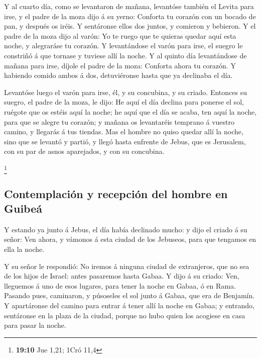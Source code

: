  Y al cuarto día, como se levantaron de mañana, levantóse
también el Levita para irse, y el padre de la moza dijo á su yerno:
Conforta tu corazón con un bocado de pan, y después os iréis.
 Y sentáronse ellos dos juntos, y comieron y bebieron. Y el
padre de la moza dijo al varón: Yo te ruego que te quieras quedar aquí
esta noche, y alegraráse tu corazón.  Y levantándose el
varón para irse, el suegro le constriñó á que tornase y tuviese allí la
noche.  Y al quinto día levantándose de mañana para irse,
díjole el padre de la moza: Conforta ahora tu corazón. Y habiendo comido
ambos á dos, detuviéronse hasta que ya declinaba el día.

 Levantóse luego el varón para irse, él, y su concubina, y
su criado. Entonces su suegro, el padre de la moza, le dijo: He aquí el
día declina para ponerse el sol, ruégote que os estéis aquí la noche; he
aquí que el día se acaba, ten aquí la noche, para que se alegre tu
corazón; y mañana os levantaréis temprano á vuestro camino, y llegarás á
tus tiendas.  Mas el hombre no quiso quedar allí la noche,
sino que se levantó y partió, y llegó hasta enfrente de Jebus, que es
Jerusalem, con su par de asnos aparejados, y con su concubina.

\footnote{\textbf{19:10} Jue 1,21; 1Cró 11,4}

\hypertarget{contemplaciuxf3n-y-recepciuxf3n-del-hombre-en-guibeuxe1}{%
\subsection{Contemplación y recepción del hombre en
Guibeá}\label{contemplaciuxf3n-y-recepciuxf3n-del-hombre-en-guibeuxe1}}

 Y estando ya junto á Jebus, el día había declinado mucho:
y dijo el criado á su señor: Ven ahora, y vámonos á esta ciudad de los
Jebuseos, para que tengamos en ella la noche.

 Y su señor le respondió: No iremos á ninguna ciudad de
extranjeros, que no sea de los hijos de Israel: antes pasaremos hasta
Gabaa. Y dijo á su criado:  Ven, lleguemos á uno de esos
lugares, para tener la noche en Gabaa, ó en Rama.  Pasando
pues, caminaron, y púsoseles el sol junto á Gabaa, que era de Benjamín.
 Y apartáronse del camino para entrar á tener allí la noche
en Gabaa; y entrando, sentáronse en la plaza de la ciudad, porque no
hubo quien los acogiese en casa para pasar la noche.

